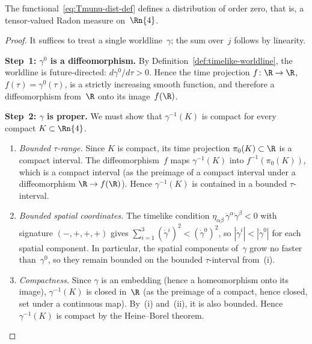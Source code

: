 \begin{proposition}\label{prop:Tmunu-well-defined}
  The functional~\eqref{eq:Tmunu-dist-def} defines a distribution
  of order zero, that is, a tensor-valued Radon measure
  on~$\Rn{4}$.
\end{proposition}

\begin{proof}
  It suffices to treat a single worldline~$\gamma$; the sum
  over~$j$ follows by linearity.

  \medskip\noindent
  \textbf{Step~1: $\gamma^0$ is a diffeomorphism.}\;
  By Definition~\ref{def:timelike-worldline}, the worldline is
  future-directed:
  $d\gamma^0/d\tau > 0$.  Hence the time projection
  $f\colon \R\to\R$, $f(\tau) = \gamma^0(\tau)$, is a strictly
  increasing smooth function, and therefore a diffeomorphism
  from~$\R$ onto its image~$f(\R)$.

  \medskip\noindent
  \textbf{Step~2: $\gamma$ is proper.}\;
  We must show that $\gamma^{-1}(K)$ is compact for every compact
  $K\subset\Rn{4}$.
  \begin{enumerate}
    \item[(i)] \emph{Bounded $\tau$-range.}\;
      Since $K$ is compact, its time projection
      $\pi_0(K) \subset \R$ is a compact interval.  The
      diffeomorphism~$f$ maps $\gamma^{-1}(K)$ into
      $f^{-1}(\pi_0(K))$, which is a compact interval (as the
      preimage of a compact interval under a diffeomorphism
      $\R\to f(\R)$).  Hence $\gamma^{-1}(K)$ is contained in a
      bounded $\tau$-interval.
    \item[(ii)] \emph{Bounded spatial coordinates.}\;
      The timelike condition
      $\eta_{\alpha\beta}\,\dot\gamma^\alpha\dot\gamma^\beta < 0$
      with signature $(-,+,+,+)$ gives
      $\sum_{i=1}^{3}(\dot\gamma^i)^2 < (\dot\gamma^0)^2$,
      so $|\dot\gamma^i| < |\dot\gamma^0|$ for each spatial
      component.  In particular, the spatial components of~$\gamma$
      grow no faster than~$\gamma^0$, so they remain bounded on
      the bounded $\tau$-interval from~(i).
    \item[(iii)] \emph{Compactness.}\;
      Since $\gamma$ is an embedding (hence a homeomorphism onto
      its image), $\gamma^{-1}(K)$ is closed in~$\R$ (as the
      preimage of a compact, hence closed, set under a continuous
      map).  By~(i) and~(ii), it is also bounded.  Hence
      $\gamma^{-1}(K)$ is compact by the Heine--Borel theorem.
  \end{enumerate}


\end{proof}
